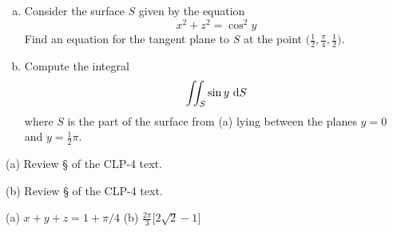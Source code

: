 \subsection*{\Application}

\begin{question}[M317 2012D] %

\begin{enumerate}[(a)]
\item
Consider the surface $S$ given by the equation
\begin{equation*}
x^2 + z^2 = \cos^2 y 
\end{equation*}
Find an equation for the tangent plane to $S$ at the point 
$\big(\frac{1}{2} , \frac{\pi}{4} , \frac{1}{2} \big)$.
\item
Compute the integral
\begin{equation*}
\iint_S \sin y\ \mathrm{d}S
\end{equation*}
where $S$ is the part of the surface from (a) lying between the planes 
$y = 0$ and $y = \frac{1}{2}\pi$.
\end{enumerate}
\end{question}

\begin{hint} 
(a)  Review \S{} of the CLP-4 text.

(b)  Review \S{} of the CLP-4 text.
\end{hint}

\begin{answer} 
(a) $x+y+z = 1+\pi/4$\qquad
(b) $\frac{2\pi}{3}\big[2\sqrt{2}-1\big]$

\end{answer}

